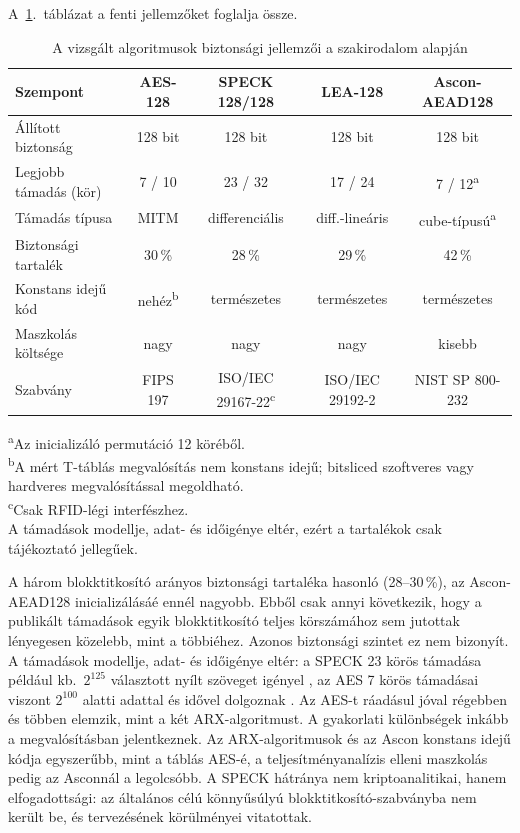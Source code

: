 \documentclass[a4paper,12pt]{report}
\theoremstyle{definition}
\theoremstyle{remark}
\begin{document}
A~\ref{table:security_compare}.~táblázat a fenti jellemzőket foglalja össze.

\begin{table}[h!]
\centering
\caption{A vizsgált algoritmusok biztonsági jellemzői a szakirodalom alapján}
\label{table:security_compare}
\footnotesize
\vspace{.2 cm}
\setlength{\tabcolsep}{3.5pt}
\begin{tabular}{lcccc}
\hline
\textbf{Szempont} & \textbf{AES-128} & \textbf{SPECK 128/128} & \textbf{LEA-128} & \textbf{Ascon-AEAD128} \\
\hline
Állított biztonság & 128 bit & 128 bit & 128 bit & 128 bit \\
Legjobb támadás (kör) & 7 / 10 & 23 / 32 & 17 / 24 & 7 / 12\textsuperscript{a} \\
Támadás típusa & MITM & differenciális & diff.-lineáris & cube-típusú\textsuperscript{a} \\
Biztonsági tartalék & 30\,\% & 28\,\% & 29\,\% & 42\,\% \\
Konstans idejű kód & nehéz\textsuperscript{b} & természetes & természetes & természetes \\
Maszkolás költsége & nagy & nagy & nagy & kisebb \\
Szabvány & FIPS 197 & ISO/IEC 29167-22\textsuperscript{c} & ISO/IEC 29192-2 & NIST SP 800-232 \\
\hline
\end{tabular}
\begin{flushleft}
\footnotesize
\textsuperscript{a}Az inicializáló permutáció 12 köréből.\\
\textsuperscript{b}A mért T-táblás megvalósítás nem konstans idejű; bitsliced szoftveres vagy hardveres megvalósítással megoldható.\\
\textsuperscript{c}Csak RFID-légi interfészhez.\\
A támadások modellje, adat- és időigénye eltér, ezért a tartalékok csak tájékoztató jellegűek.
\end{flushleft}
\end{table}

A három blokktitkosító arányos biztonsági tartaléka hasonló (28--30\,\%), az Ascon-AEAD128 inicializálásáé ennél nagyobb. Ebből csak annyi következik, hogy a publikált támadások egyik blokktitkosító teljes körszámához sem jutottak lényegesen közelebb, mint a többiéhez. Azonos biztonsági szintet ez nem bizonyít. A támadások modellje, adat- és időigénye eltér: a SPECK 23 körös támadása például kb.\ $2^{125}$ választott nyílt szöveget igényel \cite{Song2016}, az AES 7 körös támadásai viszont $2^{100}$ alatti adattal és idővel dolgoznak \cite{Derbez2013}. Az AES-t ráadásul jóval régebben és többen elemzik, mint a két ARX-algoritmust. A gyakorlati különbségek inkább a megvalósításban jelentkeznek. Az ARX-algoritmusok és az Ascon konstans idejű kódja egyszerűbb, mint a táblás AES-é, a teljesítményanalízis elleni maszkolás pedig az Asconnál a legolcsóbb. A SPECK hátránya nem kriptoanalitikai, hanem elfogadottsági: az általános célú könnyűsúlyú blokktitkosító-szabványba nem került be, és tervezésének körülményei vitatottak.
\end{document}
